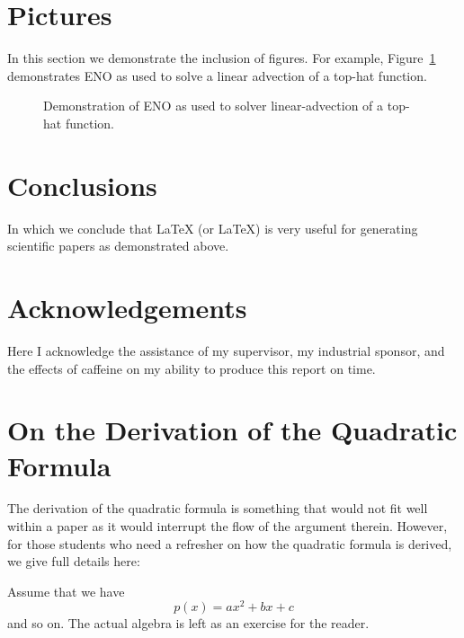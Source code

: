 \documentclass[final,3p,times,twocolumn]{elsarticle}
\begin{document}
\section{Pictures}
\label{sect:Pictures}
In this section we demonstrate the inclusion of figures. For example,
Figure~\ref{fig:ENO1} demonstrates ENO as used to solve a linear advection
of a top-hat function.
\begin{figure}
\centering
\caption{Demonstration of ENO as used to solver linear-advection of a
  top-hat function.}
\label{fig:ENO1}
\end{figure}
\section{Conclusions}
\label{sect:Concl}
In which we conclude that LaTeX (or \LaTeX) is very useful for
generating scientific papers as demonstrated above.

\section*{Acknowledgements}
Here I acknowledge the assistance of my supervisor, my industrial sponsor,
and the effects of caffeine on my ability to produce this report on time.

\appendix

\section{On the Derivation of the Quadratic Formula}
\label{app:quad}
The derivation of the quadratic formula is something that would not
fit well within a paper as it would interrupt the flow of the argument
therein. However, for those students who need a refresher on how the
quadratic formula is derived, we give full details here:\par
Assume that we have
\begin{equation}
p(x) = ax^2 + bx + c
\end{equation}
and so on. The actual algebra is left as an exercise for the reader.











\end{document}
